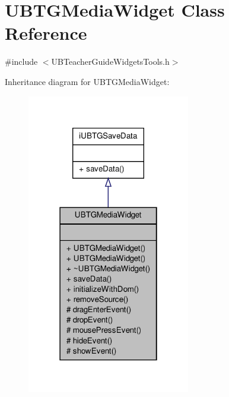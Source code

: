 \hypertarget{class_u_b_t_g_media_widget}{\section{U\-B\-T\-G\-Media\-Widget Class Reference}
\label{d1/d15/class_u_b_t_g_media_widget}
}


{\ttfamily \#include $<$U\-B\-Teacher\-Guide\-Widgets\-Tools.\-h$>$}



Inheritance diagram for U\-B\-T\-G\-Media\-Widget\-:
\nopagebreak
\begin{figure}[H]
\begin{center}
\leavevmode
\includegraphics[width=202pt]{d2/d93/class_u_b_t_g_media_widget__inherit__graph}
\end{center}
\end{figure}


